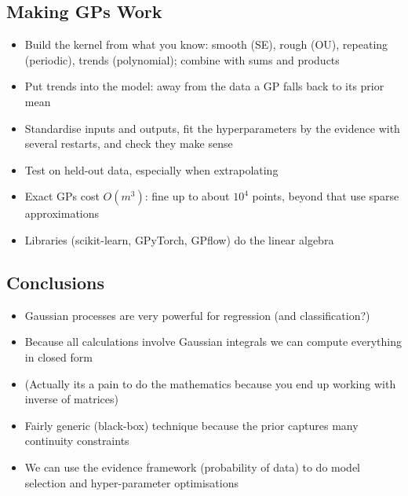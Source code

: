 \begin{slide}
\section[-1]{Making GPs Work}

\begin{PauseHighLight}
  \begin{itemize}\squeeze
  \item Build the kernel from what you know: smooth (SE), rough (OU),
    repeating (periodic), trends (polynomial); combine with sums and
    products\pause
  \item Put trends into the model: away from the data a GP falls back
    to its prior mean\pause
  \item Standardise inputs and outputs, fit the hyperparameters by the
    evidence with several restarts, and check they make sense\pause
  \item Test on held-out data, especially when extrapolating\pause
  \item Exact GPs cost $O(m^3)$: fine up to about $10^4$ points, beyond
    that use sparse approximations\pause
  \item Libraries (scikit-learn, GPyTorch, GPflow) do the
    linear algebra\pause
  \end{itemize}
\end{PauseHighLight}

\end{slide}

\begin{slide}
\section{Conclusions}

\begin{PauseHighLight}
  \begin{itemize}
  \item Gaussian processes are very powerful for regression (and
    classification?)\pause
  \item Because all calculations involve Gaussian integrals we can
    compute everything in closed form\pause
  \item (Actually its a pain to do the mathematics because you end up
    working with inverse of matrices)\pause
  \item Fairly generic (black-box) technique because the prior captures
    many continuity constraints\pause
  \item We can use the evidence framework (probability of data) to do model
    selection and hyper-parameter optimisations\pause
  \end{itemize}
\end{PauseHighLight}

\end{slide}



